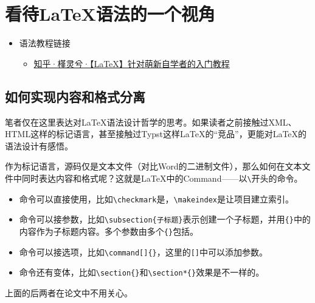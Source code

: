 \chapter{看待LaTeX语法的一个视角}

\begin{itemize}
    \item {
        语法教程链接
        \begin{itemize}
            \item \href{https://zhuanlan.zhihu.com/p/521649367?utm_source=zhihu}{知乎·槿灵兮·【LaTeX】针对萌新自学者的入门教程}
        \end{itemize}
    }
\end{itemize}

\section{如何实现内容和格式分离}


笔者仅在这里表达对LaTeX语法设计哲学的思考。如果读者之前接触过XML、HTML这样的标记语言，甚至接触过Typst这样LaTeX的“竞品”，更能对LaTeX的语法设计有感悟。

作为标记语言，源码仅是文本文件（对比Word的二进制文件），那么如何在文本文件中同时表达内容和格式呢？这就是LaTeX中的Command——以\verb|\|开头的命令。

\begin{itemize}
    \item 命令可以直接使用，比如\verb|\checkmark|是\checkmark，\verb|\makeindex|是让项目建立索引。
    \item 命令可以接参数，比如\verb|\subsection{子标题}|表示创建一个子标题，并用\verb|{}|中的内容作为子标题内容。多个参数由多个\verb|{}|包括。
    \item 命令可以接选项，比如\verb|\command[]{}|，这里的\verb|[]|中可以添加参数。
    \item 命令还有变体，比如\verb|\section{}|和\verb|\section*{}|效果是不一样的。
\end{itemize}

上面的后两者在论文中不用关心。

